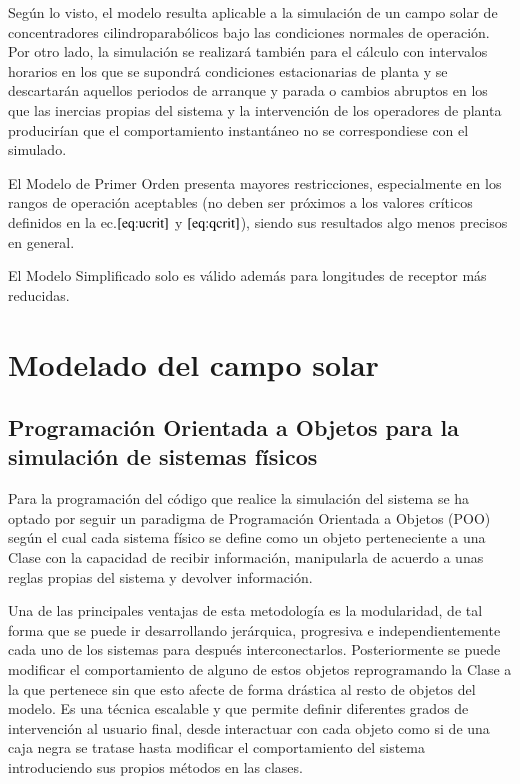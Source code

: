 \documentclass[12pt]{report} %
\begin{document}
Según lo visto, el modelo resulta aplicable a la simulación de un campo solar de concentradores cilindroparabólicos bajo las condiciones normales de operación. Por otro lado, la simulación se realizará también para el cálculo con intervalos horarios en los que se supondrá condiciones estacionarias de planta y se descartarán aquellos periodos de arranque y parada o cambios abruptos en los que las inercias propias del sistema y la intervención de los operadores de planta producirían que el comportamiento instantáneo no se correspondiese con el simulado.

El Modelo de Primer Orden presenta mayores restricciones, especialmente en los rangos de operación aceptables (no deben ser próximos a los valores críticos definidos en la ec.\(\eqref{eq:ucrit}\) y \(\eqref{eq:qcrit}\)), siendo sus resultados algo menos precisos en general.

El Modelo Simplificado solo es válido además para longitudes de receptor más reducidas.


\chapter{Modelado del campo solar}

\section{Programación Orientada a Objetos para la simulación de sistemas físicos}

Para la programación del código que realice la simulación del sistema se ha optado por seguir un paradigma de Programación Orientada a Objetos (POO) según el cual cada sistema físico se define como un objeto perteneciente a una Clase con la capacidad de recibir información, manipularla de acuerdo a unas reglas propias del sistema y devolver información.

Una de las principales ventajas de esta metodología es la modularidad, de tal forma que se puede ir desarrollando jerárquica, progresiva e independientemente cada uno de los sistemas para después interconectarlos. Posteriormente se puede modificar el comportamiento de alguno de estos objetos reprogramando la Clase a la que pertenece sin que esto afecte de forma drástica al resto de objetos del modelo. Es una técnica escalable y que permite definir diferentes grados de
intervención al usuario final, desde interactuar con cada objeto como si de una caja negra se tratase hasta modificar el comportamiento del sistema introduciendo sus propios métodos en las clases.
\end{document}
